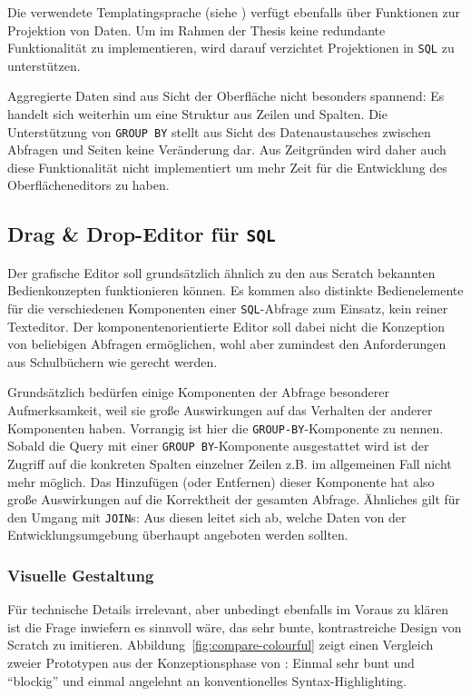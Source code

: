 Die verwendete Templatingsprache (siehe ) verfügt ebenfalls über Funktionen zur Projektion von Daten. Um im Rahmen der Thesis keine redundante Funktionalität zu implementieren, wird darauf verzichtet Projektionen in \texttt{SQL} zu unterstützen.

Aggregierte Daten sind aus Sicht der Oberfläche nicht besonders spannend: Es handelt sich weiterhin um eine Struktur aus Zeilen und Spalten. Die Unterstützung von \texttt{GROUP BY} stellt aus Sicht des Datenaustausches zwischen Abfragen und Seiten keine Veränderung dar. Aus Zeitgründen wird daher auch diese Funktionalität nicht implementiert um mehr Zeit für die Entwicklung des Oberflächeneditors zu haben.

\subsection{Drag \& Drop-Editor für \texttt{SQL}}
\label{sec:design-sql-editor}

Der grafische Editor soll grundsätzlich ähnlich zu den aus Scratch bekannten Bedienkonzepten funktionieren können. Es kommen also distinkte Bedienelemente für die verschiedenen Komponenten einer \texttt{SQL}-Abfrage zum Einsatz, kein reiner Texteditor. Der komponentenorientierte Editor soll dabei nicht die Konzeption von beliebigen Abfragen ermöglichen, wohl aber zumindest den Anforderungen aus Schulbüchern wie \cite{grimm_informatik_2015, hubwieser_inf_2} gerecht werden.

Grundsätzlich bedürfen einige Komponenten der Abfrage besonderer Aufmerksamkeit, weil sie große Auswirkungen auf das Verhalten der anderer Komponenten haben. Vorrangig ist hier die \texttt{GROUP-BY}-Komponente zu nennen. Sobald die Query mit einer \texttt{GROUP BY}-Komponente ausgestattet wird ist der Zugriff auf die konkreten Spalten einzelner Zeilen z.B. im allgemeinen Fall nicht mehr möglich. Das Hinzufügen (oder Entfernen) dieser Komponente hat also große Auswirkungen auf die Korrektheit der gesamten Abfrage. Ähnliches gilt für den Umgang mit \texttt{JOIN}s: Aus diesen leitet sich ab, welche Daten von der Entwicklungsumgebung überhaupt angeboten werden sollten.

\subsubsection{Visuelle Gestaltung}

Für technische Details irrelevant, aber unbedingt ebenfalls im Voraus zu klären ist die Frage inwiefern es sinnvoll wäre, das sehr bunte, kontrastreiche Design von Scratch zu imitieren. Abbildung~\ref{fig:compare-colourful} zeigt einen Vergleich zweier Prototypen aus der Konzeptionsphase von \idename{}: Einmal sehr bunt und "`blockig"' und einmal angelehnt an konventionelles Syntax-Highlighting.

